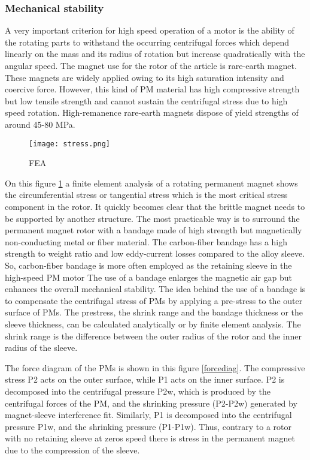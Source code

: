\subsubsection{Mechanical stability}
A very important criterion for high speed operation of a motor is the ability of the rotating parts to withstand the occurring centrifugal forces which depend linearly on the mass and its radius of rotation but increase quadratically with the angular speed. 
The magnet use for the rotor of the article is rare-earth magnet. These magnets are widely applied owing to its high saturation intensity and coercive force. However, this kind of PM material has high compressive strength but low tensile strength and cannot sustain the centrifugal stress due to high speed rotation. High-remanence rare-earth magnets dispose of yield strengths of around 45-80 MPa.

\begin{figure}[H]
    \centering
    \texttt{[image: stress.png]}
    \caption{FEA}
    \label{FEA}
\end{figure}





On this figure \ref{FEA} a finite element analysis of a rotating permanent magnet shows the circumferential stress or tangential stress which is the most critical stress component in the rotor.
It quickly becomes clear that the brittle magnet needs to be supported by another structure. The most practicable way is to surround the permanent magnet rotor with a bandage made of high strength but magnetically non-conducting metal or fiber material. 
The carbon-fiber bandage has a high strength to weight ratio and low eddy-current losses compared to the alloy sleeve. So, carbon-fiber bandage is more often employed as the retaining sleeve in the high-speed PM motor
The use of a bandage enlarges the magnetic air gap but enhances the overall mechanical stability.
The idea behind the use of a bandage is to compensate the centrifugal stress of PMs by applying a pre-stress to the outer surface of PMs.
The prestress, the shrink range and the bandage thickness or the sleeve thickness, can be calculated analytically or by finite element analysis. The shrink range is the difference between the outer radius of the rotor and the inner radius of the sleeve.


The force diagram of the PMs is shown in this figure \ref{forcediag}. The compressive stress P2 acts on the outer surface, while P1 acts on the inner surface. P2 is decomposed into the centrifugal pressure P2w, which is produced by the centrifugal forces of the PM, and the shrinking pressure (P2-P2w) generated by magnet-sleeve interference fit. Similarly, P1 is decomposed into the centrifugal pressure P1w, and the shrinking pressure (P1-P1w).
Thus, contrary to a rotor with no retaining sleeve at zeros speed there is stress in the permanent magnet due to the compression of the sleeve.


